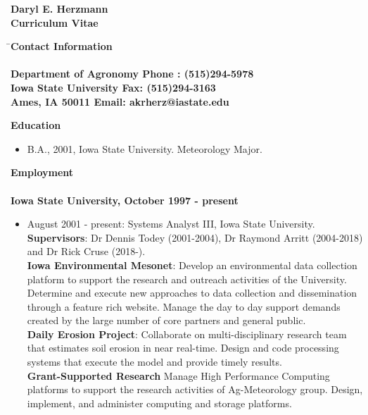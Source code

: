 \documentclass[11pt]{article}
\newcommand{\lsf}{\large \sf}
\begin{document}
%
\vspace*{0.25in}
\begin{center}
\LARGE \bf Daryl E. Herzmann\\
\Large \bf Curriculum Vitae\\
\end{center}
\begin{tabbing}
\= \Large \bf Contact Information \hspace*{2.5in} \= \\
\> \> \\
\> \lsf Department of Agronomy \> \lsf Phone : (515)294-5978\\
\> \lsf Iowa State University \> \lsf Fax: (515)294-3163\\
\> \lsf Ames, IA 50011 \> \lsf Email: akrherz@iastate.edu \\
\end{tabbing}
\Large \bf Education
\normalsize \sf
\begin{itemize}
\item B.A., 2001, Iowa State University.  Meteorology Major.
\end{itemize}
\Large \bf Employment\\ \\
\normalsize \bf Iowa State University, October 1997 - present
\normalsize \sf
\begin{itemize}
\item August 2001 - present: Systems Analyst III, Iowa State University.\\
 \textbf{Supervisors}: Dr Dennis Todey (2001-2004), Dr Raymond Arritt (2004-2018) and Dr Rick Cruse (2018-).  \\
\textbf{Iowa Environmental Mesonet}: Develop an environmental data collection
platform to support the research and outreach activities of the University.
Determine and execute new approaches to data collection and dissemination 
through a feature rich website.  Manage the day to day support demands 
created by the large number of core partners and general public. \\
\textbf{Daily Erosion Project}: Collaborate on multi-disciplinary research
team that estimates soil erosion in near real-time. Design and code processing
systems that execute the model and provide timely results. \\
\textbf{Grant-Supported Research} Manage High Performance Computing platforms
to support the research activities of Ag-Meteorology group.  Design, 
implement, and administer computing and storage platforms.
\end{itemize}
\end{document}
